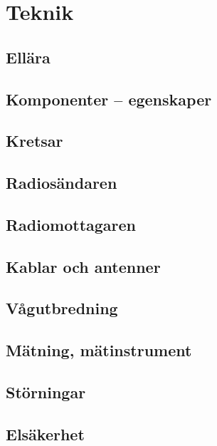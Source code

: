 \documentclass[10pt,openright]{report}
\begin{document}
\setcounter{part}{19}
\setcounter{chapter}{0}
\part{Teknik}

\chapter{Ellära}


\chapter{Komponenter -- egenskaper}


\chapter{Kretsar}


\chapter{Radiosändaren}


\chapter{Radiomottagaren}


\chapter{Kablar och antenner}


\chapter{Vågutbredning}


\chapter{Mätning, mätinstrument}


\chapter{Störningar}


\chapter{Elsäkerhet}

\end{document}
